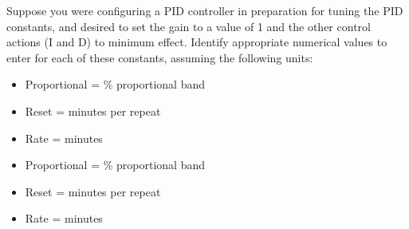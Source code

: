 

Suppose you were configuring a PID controller in preparation for tuning the PID constants, and desired to set the gain to a value of 1 and the other control actions (I and D) to minimum effect.  Identify appropriate numerical values to enter for each of these constants, assuming the following units:

\begin{itemize}
\item{} Proportional = \underbar{\hskip 50pt} \% proportional band
\vskip 5pt
\item{} Reset = \underbar{\hskip 50pt} minutes per repeat
\vskip 5pt
\item{} Rate = \underbar{\hskip 50pt} minutes
\end{itemize}







\begin{itemize}
\item{} Proportional =  \% proportional band
\item{} Reset =  minutes per repeat
\item{} Rate =  minutes
\end{itemize}










